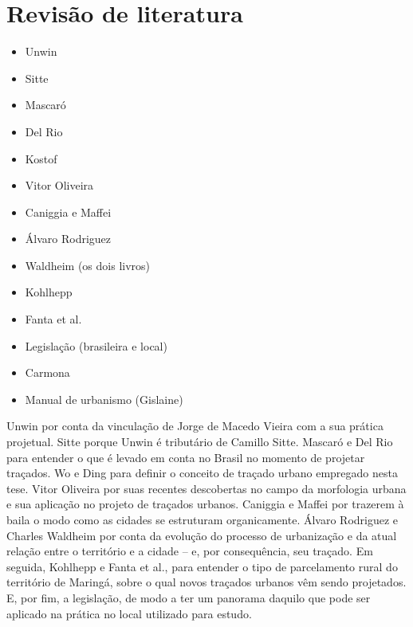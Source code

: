 \documentclass[12pt, a4paper]{book} %
\begin{document}
        \chapter[O traçado da cidade]{Revisão de literatura}

            \begin{itemize} %
                \item Unwin
                \item Sitte
                \item Mascaró %
                \item Del Rio
                \item Kostof
                \item Vitor Oliveira
                \item Caniggia e Maffei
                \item Álvaro Rodriguez
                \item Waldheim (os dois livros)
                \item Kohlhepp
                \item Fanta et al.
                \item Legislação (brasileira e local) %
                \item Carmona
                \item Manual de urbanismo (Gislaine)
            \end{itemize}
                
            Unwin por conta da vinculação de Jorge de Macedo Vieira com a sua prática projetual. Sitte porque Unwin é tributário de Camillo Sitte. Mascaró e Del Rio para entender o que é levado em conta no Brasil no momento de projetar traçados. Wo e Ding para definir o conceito de traçado urbano empregado nesta tese. Vitor Oliveira por suas recentes descobertas no campo da morfologia urbana e sua aplicação no projeto de traçados urbanos. Caniggia e Maffei por trazerem à baila o modo como as cidades se estruturam organicamente. Álvaro Rodriguez e Charles Waldheim por conta da evolução do processo de urbanização e da atual relação entre o território e a cidade – e, por consequência, seu traçado. Em seguida, Kohlhepp e Fanta et al., para entender o tipo de parcelamento rural do território de Maringá, sobre o qual novos traçados urbanos vêm sendo projetados. E, por fim, a legislação, de modo a ter um panorama daquilo que pode ser aplicado na prática no local utilizado para estudo.
\end{document}
